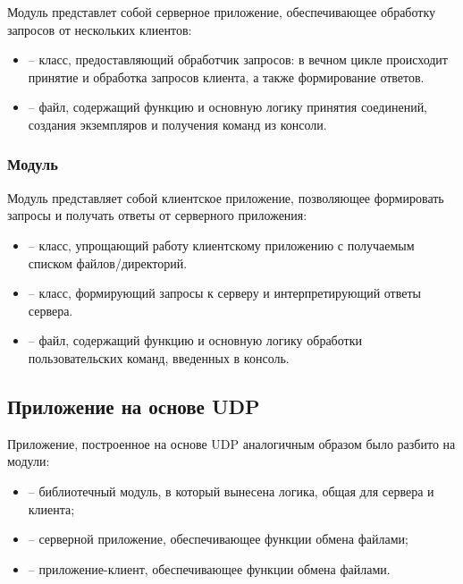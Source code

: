 Модуль  представлет собой серверное приложение, обеспечивающее обработку запросов от нескольких клиентов:
\begin{itemize}
	\item {} -- класс, предоставляющий обработчик запросов: в вечном цикле происходит принятие и обработка запросов клиента, а также формирование ответов.
	\item {} -- файл, содержащий функцию  и  основную логику принятия соединений, создания экземпляров  и получения команд из консоли.
\end{itemize}

\subsubsection{Модуль }

Модуль  представляет собой клиентское приложение, позволяющее формировать запросы и получать ответы от серверного приложения:
\begin{itemize}
	\item {} -- класс, упрощающий работу клиентскому приложению с получаемым списком файлов/директорий.
	\item {} -- класс, формирующий запросы к серверу и интерпретирующий ответы сервера.
	\item {} -- файл, содержащий функцию  и основную логику обработки пользовательских команд, введенных в консоль.
\end{itemize}

\subsection{Приложение на основе UDP}

Приложение, построенное на основе UDP  аналогичным образом было разбито на модули:
\begin{itemize}
	\item {} -- библиотечный модуль, в который вынесена логика, общая для сервера и клиента;
	\item {} -- серверной приложение, обеспечивающее функции обмена файлами;
	\item {} -- приложение-клиент, обеспечивающее функции обмена файлами.
\end{itemize}

